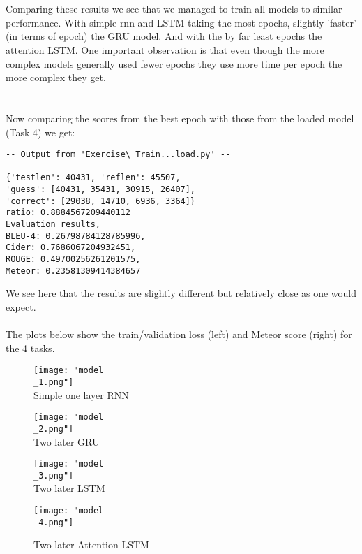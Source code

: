 \documentclass[12pt, letterpaper, twoside]{article}
\begin{document}
\ \\
\ \\
Comparing these results we see that we managed to train all models to similar performance. With simple rnn and LSTM taking the most epochs, slightly 'faster' (in terms of epoch) the GRU model. And with the by far least epochs the attention LSTM. One important observation is that even though the more complex models generally used fewer epochs they use more time per epoch the more complex they get.\\
\ \\
\ \\
Now comparing the scores from the best epoch with those from the loaded model (Task 4) we get:\\
\begin{verbatim}
-- Output from 'Exercise\_Train...load.py' --

{'testlen': 40431, 'reflen': 45507, 
'guess': [40431, 35431, 30915, 26407], 
'correct': [29038, 14710, 6936, 3364]}
ratio: 0.8884567209440112
Evaluation results, 
BLEU-4: 0.26798784128785996, 
Cider: 0.7686067204932451,  
ROUGE: 0.49700256261201575, 
Meteor: 0.23581309414384657
\end{verbatim}
We see here that the results are slightly different but relatively close as one would expect.\\
\newpage
\ \\
The plots below show the train/validation loss (left) and Meteor score (right) for the 4 tasks.\\
\begin{figure}[ht] 
  \begin{minipage}[b]{0.5\linewidth}
    \centering
    \texttt{[image: "model\\\_1.png"]}\\ 
    \caption{Simple one layer RNN} 
    \vspace{4ex}
  \end{minipage}%
  \begin{minipage}[b]{0.5\linewidth}
    \centering
    \texttt{[image: "model\\\_2.png"]}\\
    \caption{Two later GRU} 
    \vspace{4ex}
  \end{minipage} 
  \begin{minipage}[b]{0.5\linewidth}
    \centering
    \texttt{[image: "model\\\_3.png"]}\\ 
    \caption{Two later LSTM} 
    \vspace{4ex}
  \end{minipage}%
  \begin{minipage}[b]{0.5\linewidth}
    \centering
    \texttt{[image: "model\\\_4.png"]}\\
    \caption{Two later Attention LSTM} 
    \vspace{4ex}
  \end{minipage} 
\end{figure}
\end{document}
